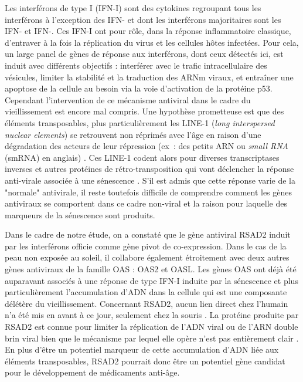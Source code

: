 Les interférons de type I (IFN-I) sont des cytokines regroupant tous les interférons à l'exception des IFN-\textgamma{} et dont les interférons majoritaires sont les IFN-\textalpha{} et IFN-\textbeta{}. Ces IFN-I ont pour rôle, dans la réponse inflammatoire classique, d'entraver à la fois la réplication du virus et les cellules hôtes infectées. Pour cela, un large panel de gènes de réponse aux interférons, dont ceux détectés ici, est induit avec différents objectifs : interférer avec le trafic intracellulaire des vésicules, limiter la stabilité et la traduction des ARNm viraux, et entraîner une apoptose de la cellule au besoin via la voie d'activation de la protéine p53. Cependant l'intervention de ce mécanisme antiviral dans le cadre du vieillissement est encore mal compris. Une hypothèse prometteuse est que des éléments transposables, plus particulièrement les LINE-1 (\textit{long interspersed nuclear elements}) se retrouvent non réprimés avec l'âge en raison d'une dégradation des acteurs de leur répression (ex : des petits ARN ou \textit{small RNA} (smRNA) en anglais) . Ces LINE-1 codent alors pour diverses transcriptases inverses et autres protéines de rétro-transposition qui vont déclencher la réponse anti-virale associée à une sénescence . S'il est admis que cette réponse varie de la "normale" antivirale, il reste toutefois difficile de comprendre comment les gènes antiviraux se comportent dans ce cadre non-viral  et la raison pour laquelle des marqueurs de la sénescence sont produits.

Dans le cadre de notre étude, on a constaté que le gène antiviral RSAD2 induit par les interférons officie comme gène pivot de co-expression. Dans le cas de la peau non exposée au soleil, il collabore également étroitement avec deux autres gènes antiviraux de la famille OAS : OAS2 et OASL. Les gènes OAS ont déjà été auparavant associés à une réponse de type IFN-I induite par la sénescence et plus particulièrement l'accumulation d'ADN dans la cellule  qui est une composante délétère du vieillissement. Concernant RSAD2, aucun lien direct chez l'humain n'a été mis en avant à ce jour, seulement chez la souris . La protéine produite par RSAD2 est connue pour limiter la réplication de l'ADN viral ou de l'ARN double brin viral bien que le mécanisme par lequel elle opère n'est pas entièrement clair . En plus d'être un potentiel marqueur de cette accumulation d'ADN liée aux éléments transposables, RSAD2 pourrait donc être un potentiel gène candidat pour le développement de médicaments anti-âge.

